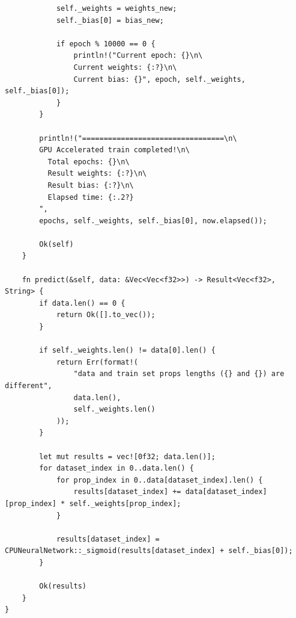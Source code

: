 \documentclass[a4paper,14pt]{extarticle}
\begin{document}
\begin{verbatim}
            self._weights = weights_new;
            self._bias[0] = bias_new;

            if epoch % 10000 == 0 {
                println!("Current epoch: {}\n\
                Current weights: {:?}\n\
                Current bias: {}", epoch, self._weights, self._bias[0]);
            }
        }

        println!("=================================\n\
        GPU Accelerated train completed!\n\
          Total epochs: {}\n\
          Result weights: {:?}\n\
          Result bias: {:?}\n\
          Elapsed time: {:.2?}
        ",
        epochs, self._weights, self._bias[0], now.elapsed());

        Ok(self)
    }

    fn predict(&self, data: &Vec<Vec<f32>>) -> Result<Vec<f32>, String> {
        if data.len() == 0 {
            return Ok([].to_vec());
        }

        if self._weights.len() != data[0].len() {
            return Err(format!(
                "data and train set props lengths ({} and {}) are different",
                data.len(),
                self._weights.len()
            ));
        }

        let mut results = vec![0f32; data.len()];
        for dataset_index in 0..data.len() {
            for prop_index in 0..data[dataset_index].len() {
                results[dataset_index] += data[dataset_index][prop_index] * self._weights[prop_index];    
            }

            results[dataset_index] = CPUNeuralNetwork::_sigmoid(results[dataset_index] + self._bias[0]);
        }

        Ok(results)
    }
}
\end{verbatim}
\end{document}
